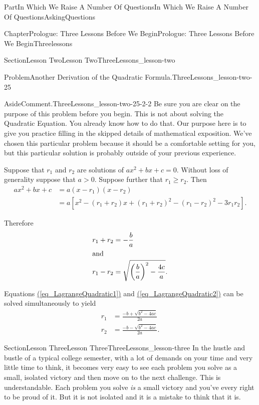 \documentclass[oneside,10pt,]{book}
\newcommand{\xreffont}{\relax}
\numberwithin{equation}{part}
\newcommand{\amp}{&}
\begin{document}
\begin{partptx}{Part}{In Which We Raise A Number Of Questions}{}{In Which We Raise A Number Of Questions}{}{}{AskingQuestions}
\begin{chapterptx}{Chapter}{Prologue: Three Lessons Before We Begin}{}{Prologue: Three Lessons Before We Begin}{}{}{Threelessons}
\begin{sectionptx}{Section}{Lesson Two}{}{Lesson Two}{}{}{ThreeLessons_lesson-two}
\begin{problem}{Problem}{Another Derivation of the Quadratic Formula.}{ThreeLessons_lesson-two-25}
\begin{aside}{Aside}{Comment.}{ThreeLessons_lesson-two-25-2-2}%
Be sure you are clear on the purpose of this problem before you begin.  This is not about solving the Quadratic Equation.  You already know how to do that.  Our purpose here is to give you practice filling in the skipped details of mathematical exposition.  We've chosen this particular problem because it should be a comfortable setting for you, but this particular solution is probably outside of your previous experience.%
\end{aside}
Suppose that \(r_1\) and \(r_2\) are solutions of \(ax^2+bx+c=0\). Without loss of generality suppose that \(a>0\).  Suppose further that \(r_1\ge r_2\).  Then%
\begin{align*}
ax^2+bx+c \amp = a(x-r_1)(x-r_2)\\
\amp =
a\left[x^2-(r_1+r_2)x+(r_1+r_2)^2-(r_1-r_2)^2-3r_1r_2\right].
\end{align*}
%
\par
Therefore%
\begin{align}
r_1+r_2\amp = -\frac{b}{a}\label{eq_LagrangeQuadratic1}\\
\intertext{and}
r_1-r_2 \amp = \sqrt{\left(\frac{b}{a}\right)^2-\frac{4c}{a}}\text{.}\label{eq_LagrangeQuadratic2}
\end{align}
%
\par
Equations \hyperref[eq_LagrangeQuadratic1]{({\xreffont\ref{eq_LagrangeQuadratic1}})} and \hyperref[eq_LagrangeQuadratic2]{({\xreffont\ref{eq_LagrangeQuadratic2}})} can be solved simultaneously to yield%
\begin{align*}
r_1\amp =\frac{-b+\sqrt{b^2-4ac}}{2a}\\
r_2\amp =\frac{-b-\sqrt{b^2-4ac}}{2a}\text{.}
\end{align*}
%
\end{problem}
\end{sectionptx}
%
%
\typeout{************************************************}
\typeout{************************************************}
%
\begin{sectionptx}{Section}{Lesson Three}{}{Lesson Three}{}{}{ThreeLessons_lesson-three}
In the hustle and bustle of a typical college semester, with a lot of demands on your time and very little time to think, it becomes very easy to see each problem you solve as a small, isolated victory and then move on to the next challenge.  This is understandable.  Each problem you solve \emph{is} a small victory and you've every right to be proud of it.  But it is not isolated and it is a mistake to think that it is.%

\end{sectionptx}
\end{chapterptx}
\end{partptx}
\end{document}
